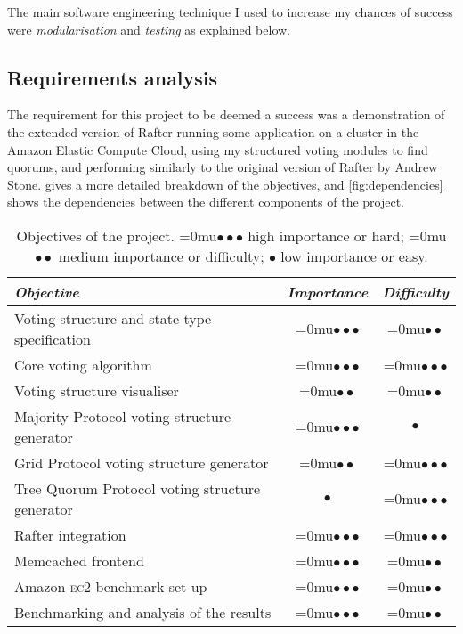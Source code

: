 \documentclass[12pt,chapterprefix=true,toc=bibliography,numbers=noendperiod,
               footnotes=multiple,twoside]{scrreprt}
\newcommand{\ECC}[0]{\textsc{ec}2 }
\newcommand{\zerospacing}[0]{\medmuskip=0mu}
\newcommand{\high}[0]{{\color{purple!90}\zerospacing \(\bullet \bullet \bullet\)} }
\newcommand{\hard}[0]{{\color{purple!90}\zerospacing \(\bullet \bullet \bullet\)} }
\newcommand{\medium}[0]{{\color{violet!80}\zerospacing \(\bullet \bullet\)} }
\newcommand{\easy}[0]{{\color{teal!80}\(\bullet\)} }
\newcommand{\low}[0]{{\color{teal!80}\(\bullet\)} }
\begin{document}
The main software engineering technique I used to increase my chances of success were \emph{modularisation} and \emph{testing} as explained below.

\subsection{Requirements analysis}
\label{sc:requirements-analysis}

The requirement for this project to be deemed a success was a demonstration of the extended version of Rafter running some application on a cluster in the Amazon Elastic Compute Cloud, using my structured voting modules to find quorums, and performing similarly to the original version of Rafter by Andrew Stone.  gives a more detailed breakdown of the objectives, and \cref{fig:dependencies} shows the dependencies between the different components of the project.

\begin{table}[h]
    \centering
    \begin{tabularx}{\textwidth}{X c c}
        \toprule
        \textit{Objective} & \textit{Importance} & \textit{Difficulty} \\
        \midrule
        Voting structure and state type specification & \high & \medium \\
        Core voting algorithm & \high & \hard \\
        Voting structure visualiser & \medium & \medium \\
        Majority Protocol voting structure generator & \high & \easy \\
        Grid Protocol voting structure generator & \medium & \hard \\
        Tree Quorum Protocol voting structure generator & \low & \hard \\
        Rafter integration & \high & \hard \\
        Memcached frontend & \high & \medium \\
        Amazon \ECC benchmark set-up & \high & \medium \\
        Benchmarking and analysis of the results & \high & \medium \\
        \bottomrule
    \end{tabularx}
    \caption{Objectives of the project. \high high importance or hard; \medium medium importance or difficulty; \low low importance or easy.}
    \label{tab:objectives}
\end{table}
\end{document}
